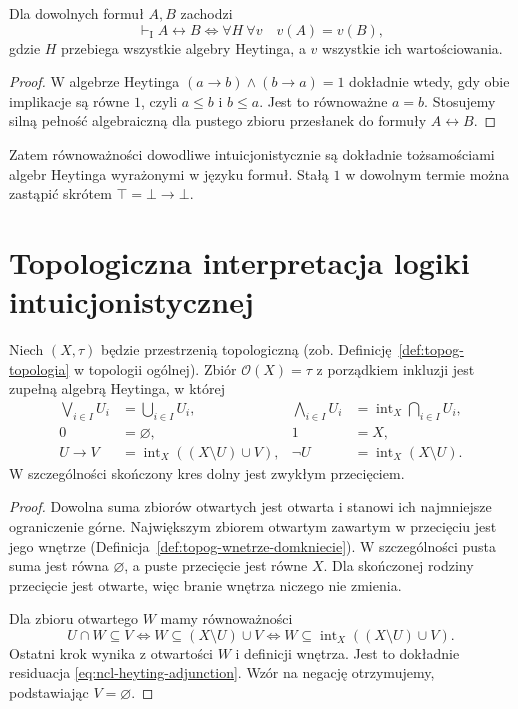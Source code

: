 \begin{stwierdzenie}
\label{prop:ncl-heyting-equational}
Dla dowolnych formuł $A,B$ zachodzi
\[
 \vdash_{\mathrm I}A\leftrightarrow B
 \iff \forall H\ \forall v\quad v(A)=v(B),
\]
gdzie $H$ przebiega wszystkie algebry Heytinga,
a $v$ wszystkie ich wartościowania.
\end{stwierdzenie}
\begin{proof}
W algebrze Heytinga
$(a\to b)\wedge(b\to a)=1$ dokładnie wtedy,
gdy obie implikacje są równe $1$, czyli
$a\leq b$ i $b\leq a$. Jest to równoważne $a=b$.
Stosujemy silną pełność algebraiczną dla
pustego zbioru przesłanek do formuły
$A\leftrightarrow B$.
\end{proof}
Zatem równoważności dowodliwe intuicjonistycznie
są dokładnie tożsamościami algebr Heytinga
wyrażonymi w języku formuł.
Stałą $1$ w dowolnym termie można zastąpić
skrótem $\top=\bot\to\bot$.

\section{Topologiczna interpretacja logiki intuicjonistycznej}

\begin{twierdzenie}
\label{thm:ncl-heyting-open-sets}
Niech $(X,\tau)$ będzie przestrzenią topologiczną
(zob. Definicję~\ref{def:topog-topologia} w topologii
ogólnej). Zbiór $\mathcal O(X)=\tau$ z porządkiem
inkluzji jest zupełną algebrą Heytinga, w której
\[
\begin{aligned}
 \bigvee_{i\in I}U_i&=\bigcup_{i\in I}U_i,&
 \bigwedge_{i\in I}U_i&=\operatorname{int}_X
                          \bigcap_{i\in I}U_i,\\
 0&=\varnothing,&1&=X,\\
 U\to V&=\operatorname{int}_X((X\setminus U)\cup V),&
 \neg U&=\operatorname{int}_X(X\setminus U).
\end{aligned}
\]
W szczególności skończony kres dolny jest
zwykłym przecięciem.
\end{twierdzenie}
\begin{proof}
Dowolna suma zbiorów otwartych jest otwarta
i stanowi ich najmniejsze ograniczenie górne.
Największym zbiorem otwartym zawartym
w przecięciu jest jego wnętrze
(Definicja~\ref{def:topog-wnetrze-domkniecie}).
W szczególności pusta suma jest równa
$\varnothing$, a puste przecięcie jest równe $X$.
Dla skończonej rodziny przecięcie jest otwarte,
więc branie wnętrza niczego nie zmienia.

Dla zbioru otwartego $W$ mamy równoważności
\[
 U\cap W\subseteq V
 \iff W\subseteq (X\setminus U)\cup V
 \iff W\subseteq\operatorname{int}_X((X\setminus U)\cup V).
\]
Ostatni krok wynika z otwartości $W$ i definicji
wnętrza. Jest to dokładnie residuacja
\eqref{eq:ncl-heyting-adjunction}.
Wzór na negację otrzymujemy, podstawiając
$V=\varnothing$.
\end{proof}


